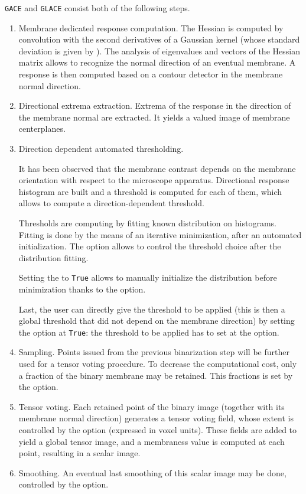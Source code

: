 \texttt{GACE} and \texttt{GLACE} consist both of the following steps.
\begin{enumerate}
\itemsep -0.5ex
\item Membrane dedicated response computation. The Hessian is computed by convolution with the second derivatives of a Gaussian kernel (whose standard  deviation is given by ). The analysis of eigenvalues and vectors of the Hessian matrix allows to recognize the normal direction of an eventual membrane. A response is then computed based on a contour detector in the membrane normal direction.
\item Directional extrema extraction. Extrema of the response in the direction of the membrane normal are extracted. It yields a valued image of membrane centerplanes.
\item \label{it:gace:threshold} Direction dependent automated thresholding.

It has been observed that the membrane contrast depends on the membrane orientation with respect to the microscope apparatus. Directional response histogram are built and a threshold is computed for each of them, which allows to compute a direction-dependent threshold. 

Thresholds are computing by fitting known distribution on histograms. Fitting is done by the means of an iterative minimization, after an automated initialization. The  option allows to control the threshold choice after the distribution fitting.

Setting the  to \texttt{True} allows to manually initialize the distribution before minimization thanks to the  option.

Last, the user can directly give the threshold to be applied (this is then a global threshold that did not depend on the membrane direction) by setting the  option at \texttt{True}: the threshold to be applied has to set at the  option.

\item Sampling. Points issued from the previous binarization step will be further used for a tensor voting procedure. To decrease the computational cost, only a fraction of the binary membrane may be retained. 
This fractions is set by the  option.

\item \label{it:gace:tensorvoting} Tensor voting.
Each retained point of the binary image (together with its membrane normal direction) generates a tensor voting field, whose extent is controlled by the  option (expressed in voxel units). These fields are added to yield a global tensor image, and a membraness value is computed at each point, resulting in a scalar image.

\item Smoothing. An eventual last smoothing of this scalar image may be done, controlled by the  option.
\end{enumerate}





